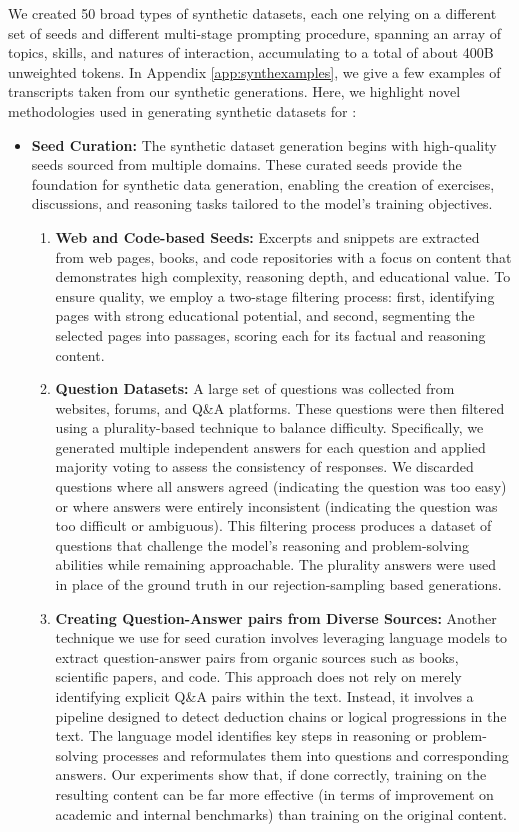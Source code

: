 We created 50 broad types of synthetic datasets, each one relying on a different set of seeds and different multi-stage prompting procedure, spanning an array of topics, skills, and natures of interaction, accumulating to a total of about 400B unweighted tokens. In Appendix \ref{app:synthexamples}, we give a few examples of transcripts taken from our synthetic generations.
Here, we highlight novel methodologies used in generating synthetic datasets for \modelwithoutspace:
\begin{itemize}
\item \textbf{Seed Curation:} The synthetic dataset generation begins with high-quality seeds sourced from multiple domains.  These curated seeds provide the foundation for synthetic data generation, enabling the creation of exercises, discussions, and reasoning tasks tailored to the model's training objectives.
\begin{enumerate}
    \item \textbf{Web and Code-based Seeds:} Excerpts and snippets are extracted from web pages, books, and code repositories with a focus on content that demonstrates high complexity, reasoning depth, and educational value. To ensure quality, we employ a two-stage filtering process: first, identifying pages with strong educational potential, and second, segmenting the selected pages into passages, scoring each for its factual and reasoning content.
    \item \textbf{Question Datasets:} A large set of questions was collected from websites, forums, and Q\&A platforms. These questions were then filtered using a plurality-based technique to balance difficulty. Specifically, we generated multiple independent answers for each question and applied majority voting to assess the consistency of responses. We discarded questions where all answers agreed (indicating the question was too easy) or where answers were entirely inconsistent (indicating the question was too difficult or ambiguous). This filtering process produces a dataset of questions that challenge the model's reasoning and problem-solving abilities while remaining approachable. The plurality answers were used in place of the ground truth in our rejection-sampling based generations. 
    \item \textbf{Creating Question-Answer pairs from Diverse Sources:} Another technique we use for seed curation involves leveraging language models to extract question-answer pairs from organic sources such as books, scientific papers, and code. This approach does not rely on merely identifying explicit Q\&A pairs within the text. Instead, it involves a pipeline designed to detect deduction chains or logical progressions in the text. The language model identifies key steps in reasoning or problem-solving processes and reformulates them into questions and corresponding answers. Our experiments show that, if done correctly, training on the resulting content can be far more effective (in terms of improvement on academic and internal benchmarks) than training on the original content. 

\end{enumerate}
\end{itemize}
